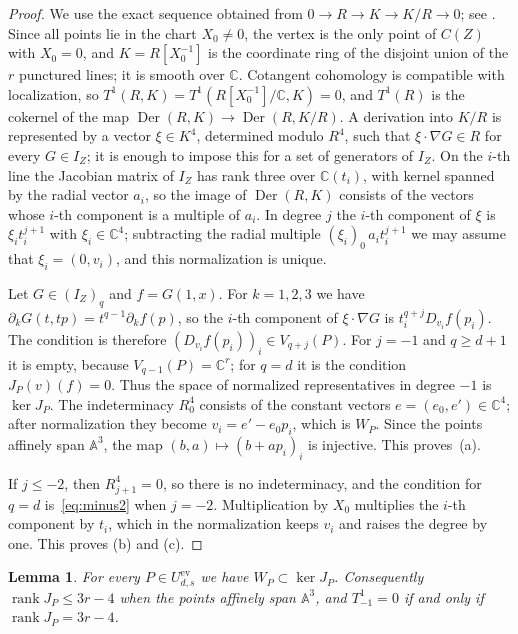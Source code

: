 \documentclass{amsart}
\newtheorem{lemma}[theorem]{Lemma}
\theoremstyle{definition}
\theoremstyle{remark}
\numberwithin{equation}{section}
\newcommand{\CC}{\mathbb{C}}
\newcommand{\A}{\mathbb{A}}
\DeclareMathOperator{\rank}{rank}
\begin{document}
\begin{proof}
We use the exact sequence obtained from $0\to R\to K\to K/R\to0$; see
\cite[Section~1.4, (1)]{Stevens}. Since all points lie in the chart $X_0\ne0$, the
vertex is the only point of $C(Z)$ with $X_0=0$, and $K=R[X_0^{-1}]$ is the coordinate
ring of the disjoint union of the $r$ punctured lines; it is smooth over $\CC$. Cotangent
cohomology is compatible with localization, so $T^1(R,K)=T^1(R[X_0^{-1}]/\CC,K)=0$, and
$T^1(R)$ is the cokernel of the map
$\operatorname{Der}(R,K)\to\operatorname{Der}(R,K/R)$. A derivation into $K/R$
is represented by a vector $\xi\in K^4$, determined modulo $R^4$, such that
$\xi\cdot\nabla G\in R$ for every $G\in I_Z$; it is enough to impose this for
a set of generators of $I_Z$. On the $i$-th line the Jacobian matrix of $I_Z$
has rank three over $\CC(t_i)$, with kernel spanned by the radial vector $a_i$,
so the image of $\operatorname{Der}(R,K)$ consists of the vectors whose $i$-th
component is a multiple of $a_i$. In degree $j$ the $i$-th component of $\xi$ is
$\xi_it_i^{j+1}$ with $\xi_i\in\CC^4$; subtracting the radial multiple
$(\xi_i)_0\,a_it_i^{j+1}$ we may assume that $\xi_i=(0,v_i)$, and this normalization
is unique.

Let $G\in(I_Z)_q$ and $f=G(1,x)$. For $k=1,2,3$ we have
$\partial_kG(t,tp)=t^{q-1}\partial_kf(p)$, so the $i$-th component of
$\xi\cdot\nabla G$ is $t_i^{q+j}D_{v_i}f(p_i)$. The condition is therefore
$(D_{v_i}f(p_i))_i\in V_{q+j}(P)$. For $j=-1$ and $q\ge d+1$ it is empty, because
$V_{q-1}(P)=\CC^r$; for $q=d$ it is the condition $J_P(v)(f)=0$. Thus the space of
normalized representatives in degree $-1$ is $\ker J_P$. The indeterminacy $R^4_{0}$
consists of the constant vectors $e=(e_0,e')\in\CC^4$; after normalization
they become $v_i=e'-e_0p_i$, which is $W_P$. Since the points affinely span $\A^3$, the
map $(b,a)\mapsto(b+ap_i)_i$ is injective. This proves~(a).

If $j\le-2$, then $R^4_{j+1}=0$, so there is no indeterminacy, and the
condition for $q=d$ is~\eqref{eq:minus2} when $j=-2$. Multiplication by $X_0$
multiplies the $i$-th component by $t_i$, which in the normalization keeps $v_i$
and raises the degree by one. This proves (b) and (c).
\end{proof}

\begin{lemma}\label{lem:Wker}
For every $P\in U^{\mathrm{ev}}_{d,s}$ we have $W_P\subset\ker J_P$. Consequently
$\rank J_P\le 3r-4$ when the points affinely span $\A^3$, and $T^1_{-1}=0$ if and
only if $\rank J_P=3r-4$.
\end{lemma}
\end{document}
